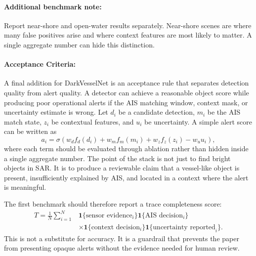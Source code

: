 \documentclass{article}
\begin{document}
\paragraph{Additional benchmark note:}

Report near-shore and open-water results separately. Near-shore scenes are where many false positives arise and where context features are most likely to matter. A single aggregate number can hide this distinction.

\paragraph{Acceptance Criteria:}

A final addition for DarkVesselNet is an acceptance rule that separates detection quality from alert quality. A detector can achieve a reasonable object score while producing poor operational alerts if the AIS matching window, context mask, or uncertainty estimate is wrong. Let $d_i$ be a candidate detection, $m_i$ be the AIS match state, $z_i$ be contextual features, and $u_i$ be uncertainty. A simple alert score can be written as
\begin{equation}
  a_i =
  \sigma\!\left(
    w_d f_d(d_i)
    + w_m f_m(m_i)
    + w_z f_z(z_i)
    - w_u u_i
  \right),
\end{equation}
where each term should be evaluated through ablation rather than hidden inside a single aggregate number. The point of the stack is not just to find bright objects in SAR. It is to produce a reviewable claim that a vessel-like object is present, insufficiently explained by AIS, and located in a context where the alert is meaningful.

The first benchmark should therefore report a trace completeness score:
\begin{equation}
\begin{aligned}
T=\frac{1}{N}\sum_{i=1}^{N}
&\mathbf{1}\{\text{sensor evidence}_i\}\mathbf{1}\{\text{AIS decision}_i\}\\
&\times\mathbf{1}\{\text{context decision}_i\}\mathbf{1}\{\text{uncertainty reported}_i\}.
\end{aligned}
\end{equation}
This is not a substitute for accuracy. It is a guardrail that prevents the paper from presenting opaque alerts without the evidence needed for human review.
\end{document}
